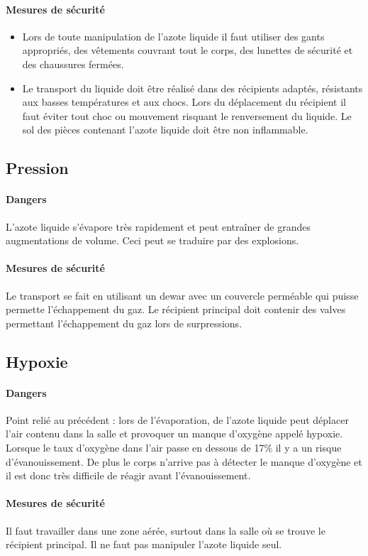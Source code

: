 \paragraph{Mesures de sécurité}

\begin{itemize}
  \item Lors de toute manipulation de l'azote liquide il faut utiliser des gants appropriés, des vêtements couvrant tout le corps, des lunettes de sécurité et des chaussures fermées.
  \item Le transport du liquide doit être réalisé dans des récipients adaptés, résistants aux basses températures et aux chocs. Lors du déplacement du récipient il faut éviter tout choc ou mouvement risquant le renversement du liquide. Le sol des pièces contenant l'azote liquide doit être non inflammable.
\end{itemize}

\subsection{Pression}

\paragraph{Dangers}

L'azote liquide s'évapore très rapidement et peut entraîner de grandes augmentations de volume. Ceci peut se traduire par des explosions.
\paragraph{Mesures de sécurité}

Le transport se fait en utilisant un dewar avec un couvercle perméable qui puisse permette l'échappement du gaz. Le récipient principal doit contenir des valves permettant l'échappement du gaz lors de surpressions.

\subsection{Hypoxie}

\paragraph{Dangers}

Point relié au précédent : lors de l'évaporation, de l'azote liquide peut déplacer l'air contenu dans la salle et provoquer un manque d'oxygène appelé hypoxie. Lorsque le taux d'oxygène dans l'air passe en dessous de 17\% il y a un risque d'évanouissement. De plus le corps n'arrive pas à détecter le manque d'oxygène et il est donc très difficile de réagir avant l'évanouissement.
\paragraph{Mesures de sécurité}

Il faut travailler dans une zone aérée, surtout dans la salle où se trouve le récipient principal. Il ne faut pas manipuler l'azote liquide seul.





